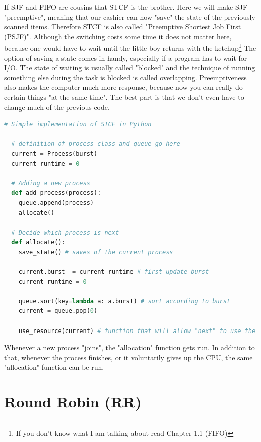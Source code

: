 \documentclass{report}
\newcounter{defi}[section]\setcounter{defi}{0}
\begin{document}
If SJF and FIFO are cousins that STCF is the brother.
Here we will make SJF "preemptive", meaning that our cashier can now "save" the state of the previously scanned items. 
Therefore STCF is also called "Preemptive Shortest Job First (PSJF)".
Although the switching costs some time it does not matter here, because one would have to wait until the little boy returns with the ketchup\footnote{If you don't know what I am talking about read Chapter 1.1 (FIFO)}
The option of saving a state comes in handy, especially if a program has to wait for I/O.
The state of waiting is usually called "blocked" and the technique of running something else during the task is blocked is called overlapping.
Preemptiveness also makes the computer much more response, because now you can really do certain things "at the same time".
The best part is that we don't even have to change much of the previous code.
\pagebreak
\begin{lstlisting}[language=Python, style=colorEX, label=cd:stcf-python]
  # Simple implementation of STCF in Python
  
  # definition of process class and queue go here
  current = Process(burst)
  current_runtime = 0
  
  # Adding a new process
  def add_process(process): 
    queue.append(process)
    allocate()
  
  # Decide which process is next
  def allocate():
    save_state() # saves of the current process

    current.burst -= current_runtime # first update burst
    current_runtime = 0

    queue.sort(key=lambda a: a.burst) # sort according to burst
    current = queue.pop(0)

    use_resource(current) # function that will allow "next" to use the CPU (also tracks runtime)
\end{lstlisting}
Whenever a new process "joins", the "allocation" function gets run.
In addition to that, whenever the process finishes, or it voluntarily gives up the CPU, the same "allocation" function can be run.


\section{Round Robin (RR)}
\end{document}
